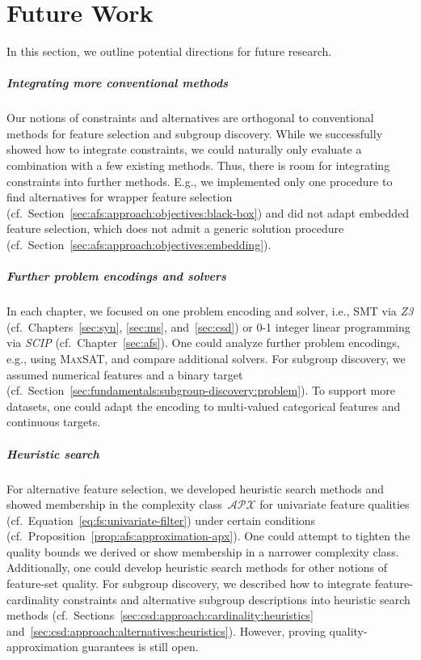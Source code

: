 \chapter{Future Work}
\label{sec:future-work}

In this section, we outline potential directions for future research.

\paragraph{Integrating more conventional methods}

Our notions of constraints and alternatives are orthogonal to conventional methods for feature selection and subgroup discovery.
While we successfully showed how to integrate constraints, we could naturally only evaluate a combination with a few existing methods.
Thus, there is room for integrating constraints into further methods.
E.g., we implemented only one procedure to find alternatives for wrapper feature selection (cf.~Section~\ref{sec:afs:approach:objectives:black-box}) and did not adapt embedded feature selection, which does not admit a generic solution procedure (cf.~Section~\ref{sec:afs:approach:objectives:embedding}).

\paragraph{Further problem encodings and solvers}

In each chapter, we focused on one problem encoding and solver, i.e., SMT via \emph{Z3} (cf.~Chapters~\ref{sec:syn}, \ref{sec:ms}, and~\ref{sec:csd}) or 0-1 integer linear programming via \emph{SCIP} (cf.~Chapter~\ref{sec:afs}).
One could analyze further problem encodings, e.g., using \textsc{MaxSAT}, and compare additional solvers.
For subgroup discovery, we assumed numerical features and a binary target (cf.~Section~\ref{sec:fundamentals:subgroup-discovery:problem}).
To support more datasets, one could adapt the encoding to multi-valued categorical features and continuous targets.

\paragraph{Heuristic search}

For alternative feature selection, we developed heuristic search methods and showed membership in the complexity class~$\mathcal{APX}$ for univariate feature qualities (cf.~Equation~\ref{eq:fs:univariate-filter}) under certain conditions (cf.~Proposition~\ref{prop:afs:approximation-apx}).
One could attempt to tighten the quality bounds we derived or show membership in a narrower complexity class.
Additionally, one could develop heuristic search methods for other notions of feature-set quality.
For subgroup discovery, we described how to integrate feature-cardinality constraints and alternative subgroup descriptions into heuristic search methods (cf.~Sections~\ref{sec:csd:approach:cardinality:heuristics} and~\ref{sec:csd:approach:alternatives:heuristics}).
However, proving quality-approximation guarantees is still open.

